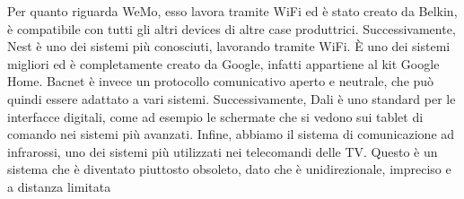 Per quanto riguarda WeMo, esso lavora tramite WiFi ed è stato creato da Belkin, è compatibile con tutti gli altri devices di altre case produttrici. Successivamente, Nest è uno dei sistemi più conosciuti, lavorando tramite WiFi. È uno dei sistemi migliori ed è completamente creato da Google, infatti appartiene al kit Google Home.
Bacnet è invece un protocollo comunicativo aperto e neutrale, che può quindi essere adattato a vari sistemi. Successivamente, Dali è uno standard per le interfacce digitali, come ad esempio le schermate che si vedono sui tablet di comando nei sistemi più avanzati. 
Infine, abbiamo il sistema di comunicazione ad infrarossi, uno dei sistemi più utilizzati nei telecomandi delle TV. Questo è un sistema che è diventato piuttosto obsoleto, dato che è unidirezionale, impreciso e a distanza limitata
